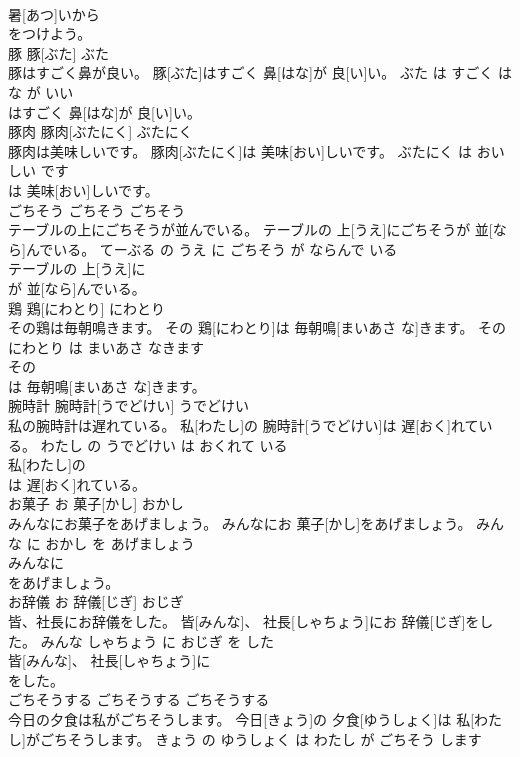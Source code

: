 \documentclass[8pt]{extreport}
\begin{document}
\begin{CJK}{UTF8}{min}
\\	暑[あつ]いから
\\	をつけよう。		
\\	豚	豚[ぶた]	ぶた	
\\	豚はすごく鼻が良い。	豚[ぶた]はすごく 鼻[はな]が 良[い]い。	ぶた は すごく はな が いい	
\\	はすごく 鼻[はな]が 良[い]い。		
\\	豚肉	豚肉[ぶたにく]	ぶたにく	
\\	豚肉は美味しいです。	豚肉[ぶたにく]は 美味[おい]しいです。	ぶたにく は おいしい です	
\\	は 美味[おい]しいです。		
\\	ごちそう	ごちそう	ごちそう	
\\	テーブルの上にごちそうが並んでいる。	テーブルの 上[うえ]にごちそうが 並[なら]んでいる。	てーぶる の うえ に ごちそう が ならんで いる	
\\	テーブルの 上[うえ]に
\\	が 並[なら]んでいる。		
\\	鶏	鶏[にわとり]	にわとり	
\\	その鶏は毎朝鳴きます。	その 鶏[にわとり]は 毎朝鳴[まいあさ な]きます。	その にわとり は まいあさ なきます	
\\	その
\\	は 毎朝鳴[まいあさ な]きます。		
\\	腕時計	腕時計[うでどけい]	うでどけい	
\\	私の腕時計は遅れている。	私[わたし]の 腕時計[うでどけい]は 遅[おく]れている。	わたし の うでどけい は おくれて いる	
\\	私[わたし]の
\\	は 遅[おく]れている。		
\\	お菓子	お 菓子[かし]	おかし	
\\	みんなにお菓子をあげましょう。	みんなにお 菓子[かし]をあげましょう。	みんな に おかし を あげましょう	
\\	みんなに
\\	をあげましょう。		
\\	お辞儀	お 辞儀[じぎ]	おじぎ	
\\	皆、社長にお辞儀をした。	皆[みんな]、 社長[しゃちょう]にお 辞儀[じぎ]をした。	みんな しゃちょう に おじぎ を した	
\\	皆[みんな]、 社長[しゃちょう]に
\\	をした。		
\\	ごちそうする	ごちそうする	ごちそうする	
\\	今日の夕食は私がごちそうします。	今日[きょう]の 夕食[ゆうしょく]は 私[わたし]がごちそうします。	きょう の ゆうしょく は わたし が ごちそう します	

\end{CJK}
\end{document}
